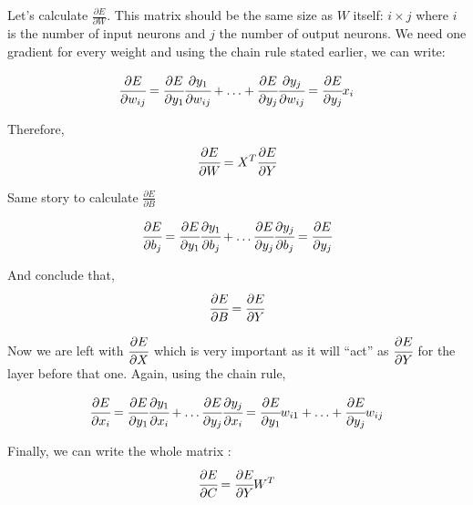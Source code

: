Let's calculate $\frac{\partial E}{\partial W}$. This matrix should be the same size as $W$ itself: $i\times j$ where $i$ is the number of input neurons and $j$ the number of output neurons. We need one gradient for every weight and using the chain rule stated earlier, we can write:

\begin{equation}
	\cfrac{\partial E}{\partial w_{ij}} = \cfrac{\partial E}{\partial y_1}\cfrac{\partial y_1}{\partial w_{ij}} + \ldots + \cfrac{\partial E}{\partial y_j}\cfrac{\partial y_j}{\partial w_{ij}} = \cfrac{\partial E}{\partial y_j}x_i 
\end{equation}

Therefore,
\begin{equation}
	\cfrac{\partial E}{\partial W} = X^T\cfrac{\partial E}{\partial Y}
\end{equation}

Same story to calculate $\frac{\partial E}{\partial B}$

\begin{equation}
	\cfrac{\partial E}{\partial b_j} = \cfrac{\partial E}{\partial y_1}\cfrac{\partial y_1}{\partial b_j} + \ldots \cfrac{\partial E}{\partial y_j}\cfrac{\partial y_j}{\partial b_j} = \cfrac{\partial E}{\partial y_j} 
\end{equation}

And conclude that,
\begin{equation}
	\cfrac{\partial E}{\partial B} = \cfrac{\partial E}{\partial Y}
\end{equation}

Now we are left with $\cfrac{\partial E}{\partial X}$ which is very important as it will “act” as $\cfrac{\partial E}{\partial Y}$ for the layer before that one. Again, using the chain rule,

\begin{equation}
	\cfrac{\partial E}{\partial x_i} = \cfrac{\partial E}{\partial y_1}\cfrac{\partial y_1}{\partial x_i} + \ldots \cfrac{\partial E}{\partial y_j}\cfrac{\partial y_j}{\partial x_i} = \cfrac{\partial E}{\partial y_1} w_{i1} + \ldots + \cfrac{\partial E}{\partial y_j} w_{ij} 
\end{equation}

Finally, we can write the whole matrix :
\begin{equation}
	\cfrac{\partial E}{\partial C} = \cfrac{\partial E}{\partial Y}W^T
\end{equation}


